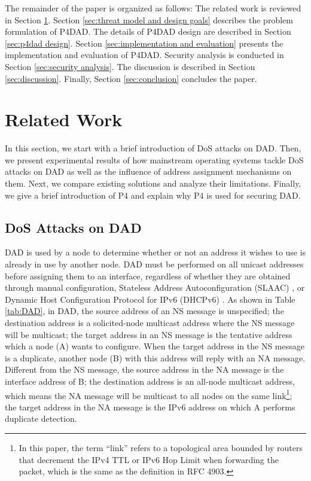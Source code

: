 \documentclass[journal]{IEEEtran}
\begin{document}
    The remainder of the paper is organized as follows: The related work is reviewed in Section \ref{sec:related work}. Section \ref{sec:threat model and design goals} describes the problem formulation of P4DAD. The details of P4DAD design are described in Section \ref{sec:p4dad design}. Section \ref{sec:implementation and evaluation} presents the implementation and evaluation of P4DAD. Security analysis is conducted in Section \ref{sec:security analysis}. The discussion is described in Section \ref{sec:discussion}. Finally, Section \ref{sec:conclusion} concludes the paper. 




\section{Related Work}\label{sec:related work}
    In this section, we start with a brief introduction of DoS attacks on DAD. Then, we present experimental results of how mainstream operating systems tackle DoS attacks on DAD as well as the influence of address assignment mechanisms on them. Next, we compare existing solutions and analyze their limitations. Finally, we give a brief introduction of P4 and explain why P4 is used for securing DAD.

    \subsection{DoS Attacks on DAD}
        DAD is used by a node to determine whether or not an address it wishes to use is already in use by another node.
        DAD must be performed on all unicast addresses before assigning them to an interface, regardless of whether they are obtained through manual configuration, Stateless Address Autoconfiguration (SLAAC) \cite{slaac}, or Dynamic Host Configuration Protocol for IPv6 (DHCPv6) \cite{DHCPv6}.
        As shown in Table \ref{tab:DAD}, in DAD, the source address of an NS message is unspecified; the destination address is a solicited-node multicast address where the NS message will be multicast; the target address in an NS message is the tentative address which a node (A) wants to configure.
        When the target address in the NS message is a duplicate, another node (B) with this address will reply with an NA message. Different from the NS message, the source address in the NA message is the interface address of B; the destination address is an all-node multicast address, which means the NA message will be multicast to all nodes on the same link\footnote{In this paper, the term ``link'' refers to a topological area bounded by routers that decrement the IPv4 TTL or IPv6 Hop Limit when forwarding the packet, which is the same as the definition in RFC 4903\cite{rfc4903}.}; the target address in the NA message is the IPv6 address on which A performs duplicate detection.
        
\end{document}
